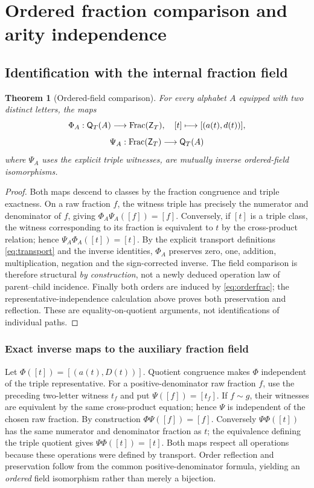 \documentclass[11pt,reqno]{amsart}
\newtheorem{theorem}{Theorem}[section]
\theoremstyle{definition}\newtheorem{definition}[theorem]{Definition}
\theoremstyle{remark}\newtheorem{remark}[theorem]{Remark}
\newcommand{\Frac}{\operatorname{Frac}}
\begin{document}
\clearpage
\section{Ordered fraction comparison and arity independence}\label{sec:arity}
\subsection{Identification with the internal fraction field}\label{main:sub-19}
\begin{theorem}[Ordered-field comparison]\label{thm:fraciso}
For every alphabet $A$ equipped with two distinct letters, the maps
\[
\Phi_A:\Q(A)\longrightarrow\Frac(\Z),\quad [t]\longmapsto[(a(t),d(t))],
\]
\[
\Psi_A:\Frac(\Z)\longrightarrow\Q(A)
\]
where $\Psi_A$ uses the explicit triple witnesses, are mutually inverse ordered-field isomorphisms.
\end{theorem}
\begin{proof}
Both maps descend to classes by the fraction congruence and triple exactness. On a raw fraction $f$, the witness triple has precisely the numerator and denominator of $f$, giving $\Phi_A\Psi_A([f])=[f]$. Conversely, if $[t]$ is a triple class, the witness corresponding to its fraction is equivalent to $t$ by the cross-product relation; hence $\Psi_A\Phi_A([t])=[t]$. By the explicit transport definitions \eqref{eq:transport} and the inverse identities, $\Phi_A$ preserves zero, one, addition, multiplication, negation and the sign-corrected inverse. The field comparison is therefore structural \emph{by construction}, not a newly deduced operation law of parent--child incidence. Finally both orders are induced by \eqref{eq:orderfrac}; the representative-independence calculation above proves both preservation and reflection. These are equality-on-quotient arguments, not identifications of individual paths.
\end{proof}

\medskip
\subsubsection*{Exact inverse maps to the auxiliary fraction field}\label{supp:6-6}
Let $\Phi([t])=[(a(t),D(t))]$. Quotient congruence makes $\Phi$ independent of the triple representative. For a positive-denominator raw fraction $f$, use the preceding two-letter witness $t_f$ and put $\Psi([f])=[t_f]$. If $f\sim g$, their witnesses are equivalent by the same cross-product equation; hence $\Psi$ is independent of the chosen raw fraction. By construction $\Phi\Psi([f])=[f]$. Conversely $\Psi\Phi([t])$ has the same numerator and denominator fraction as $t$; the equivalence defining the triple quotient gives $\Psi\Phi([t])=[t]$. Both maps respect all operations because these operations were defined by transport. Order reflection and preservation follow from the common positive-denominator formula, yielding an \emph{ordered} field isomorphism rather than merely a bijection.
\medskip
\end{document}
